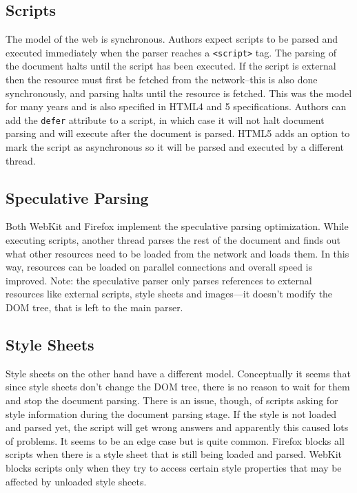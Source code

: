 \documentclass[a4paper, justified, notoc]{tufte-handout} %
\begin{document}
\subsection{Scripts} %
\label{sub:scripts}
The model of the web is synchronous. Authors expect scripts to be parsed and executed immediately when the parser reaches a \texttt{<script>} tag. The parsing of the document halts until the script has been executed. If the script is external then the resource must first be fetched from the network–this is also done synchronously, and parsing halts until the resource is fetched. This was the model for many years and is also specified in HTML4 and 5 specifications. Authors can add the \texttt{defer} attribute to a script, in which case it will not halt document parsing and will execute after the document is parsed. HTML5 adds an option to mark the script as asynchronous so it will be parsed and executed by a different thread.

\subsection{Speculative Parsing} %
\label{sub:speculative_parsing}
Both WebKit and Firefox implement the speculative parsing optimization. While executing scripts, another thread parses the rest of the document and finds out what other resources need to be loaded from the network and loads them. In this way, resources can be loaded on parallel connections and overall speed is improved. Note: the speculative parser only parses references to external resources like external scripts, style sheets and images---it doesn't modify the DOM tree, that is left to the main parser.

\subsection{Style Sheets} %
\label{sub:style_sheets}
Style sheets on the other hand have a different model. Conceptually it seems that since style sheets don't change the DOM tree, there is no reason to wait for them and stop the document parsing. There is an issue, though, of scripts asking for style information during the document parsing stage. If the style is not loaded and parsed yet, the script will get wrong answers and apparently this caused lots of problems. It seems to be an edge case but is quite common. Firefox blocks all scripts when there is a style sheet that is still being loaded and parsed. WebKit blocks scripts only when they try to access certain style properties that may be affected by unloaded style sheets.
\end{document}

